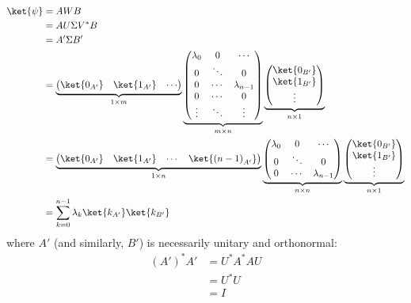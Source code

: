 \begin{align}
\ket{\psi} &= A W B \\
&= A U \Sigma V^* B \\
&= A' \Sigma B' \\
&=
\underbrace{\begin{pmatrix} \ket{0_{A'}} & \ket{1_{A'}} & \cdots \end{pmatrix}}_{1 \times m}
\underbrace{\begin{pmatrix} \lambda_0 & 0 & \cdots \\ 0 & \ddots & 0 \\ 0 & \cdots & \lambda_{n - 1} \\ 0 & \cdots & 0 \\ \vdots & \ddots & \vdots \end{pmatrix}}_{m \times n}
\underbrace{\begin{pmatrix} \ket{0_{B'}} \\ \ket{1_{B'}} \\ \vdots \end{pmatrix}}_{n \times 1} \\
&=
\underbrace{\begin{pmatrix} \ket{0_{A'}} & \ket{1_{A'}} & \cdots & \ket{\left( n - 1 \right)_{A'}} \end{pmatrix}}_{1 \times n}
\underbrace{\begin{pmatrix} \lambda_0 & 0 & \cdots \\ 0 & \ddots & 0 \\ 0 & \cdots & \lambda_{n - 1} \end{pmatrix}}_{n \times n}
\underbrace{\begin{pmatrix} \ket{0_{B'}} \\ \ket{1_{B'}} \\ \vdots \end{pmatrix}}_{n \times 1} \\
&= \sum_{k = 0}^{n - 1}{\lambda_k \ket{k_{A'}} \ket{k_{B'}}}
\end{align}
%
where $A'$ (and similarly, $B'$) is necessarily unitary and orthonormal:
%
\begin{align}
\left( A' \right)^* A' &= U^* A^* A U \\
&= U^* U \\
&= I
\end{align}
